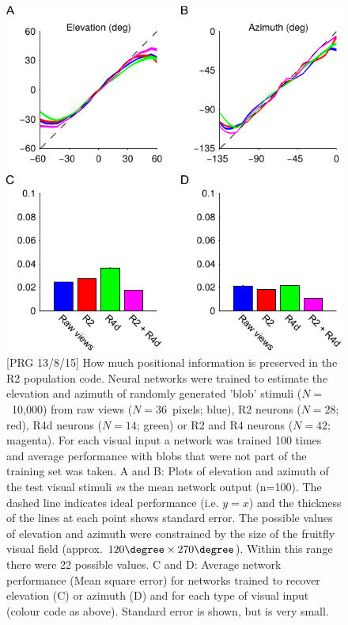\begin{figure}
\centering
\includegraphics{figures/elaz}
\caption{[PRG 13/8/15] How much positional information is preserved in the R2 population code.
Neural networks were trained to estimate the elevation and azimuth of randomly generated 'blob' stimuli ($N=$~10,000)  from raw views ($N=36$~pixels; blue), R2 neurons ($N=28$; red), R4d neurons ($N=14$; green) or R2 and R4 neurons ($N=42$; magenta). For each visual input a network was trained 100 times and average performance with blobs that were not part of the training set was taken.
A and B: Plots of elevation and azimuth of the test visual stimuli \emph{vs} the mean network output (n=100). The dashed line indicates ideal performance (i.e. $y=x$) and the thickness of the lines at each point shows standard error.
The possible values of elevation and azimuth were constrained by the size of the fruitfly visual field (approx. $120\degree \times 270\degree$). Within this range there were 22 possible values.
C and D: Average network performance (Mean square error) for networks trained to recover elevation (C) or azimuth (D) and for each type of visual input (colour code as above). Standard error is shown, but is very small.
}
\label{fig:elaz}
\end{figure}
